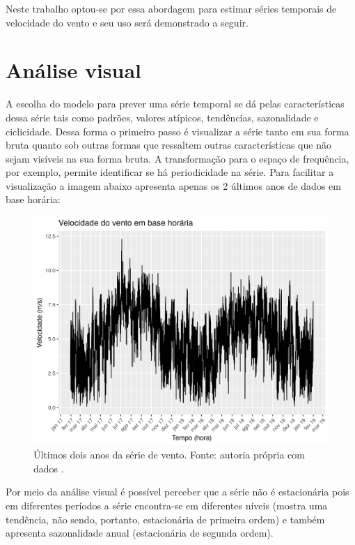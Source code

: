 \documentclass[
	12pt,				%
	openright,			%
	oneside,			%
	a4paper,			%
	english,			%
	french,				%
	spanish,			%
	brazil				%
	]{abntex2}
\begin{document}
Neste trabalho optou-se por essa abordagem para estimar séries temporais de velocidade do vento e seu uso será demonstrado a seguir.

\section{Análise visual}

A escolha do modelo para prever uma série temporal se dá pelas características dessa série tais como padrões, valores atípicos, tendências, sazonalidade e ciclicidade. Dessa forma o primeiro passo é visualizar a série tanto em sua forma bruta quanto sob outras formas que ressaltem outras características que não sejam visíveis na sua forma bruta. A transformação para o espaço de frequência, por exemplo, permite identificar se há periodicidade na série. Para facilitar a visualização a imagem abaixo apresenta apenas os 2 últimos anos de dados em base horária:

\begin{figure}[h]
    \centering
	\includegraphics[width=\textwidth]{entire_series_hourly_basis}
	\caption{Últimos dois anos da série de vento. Fonte: autoria própria com dados \cite{era5}.}
\end{figure}
\FloatBarrier

Por meio da análise visual é possível perceber que a série não é estacionária pois em diferentes períodos a série encontra-se em diferentes níveis (mostra uma tendência, não sendo, portanto, estacionária de primeira ordem) e também apresenta sazonalidade anual (estacionária de segunda ordem).
\end{document}
